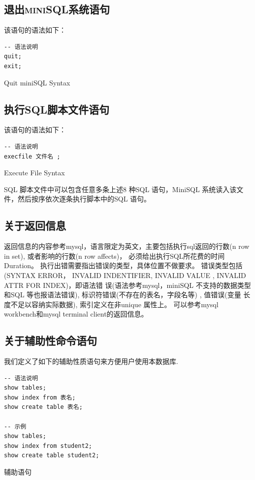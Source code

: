 \documentclass[UTF8]{ctexrep} %
\newenvironment{longlisting}{\captionsetup{type=listing}}{}
\begin{document}
\subsection{退出\textsc{miniSQL}系统语句}
该语句的语法如下：
\begin{longlisting}
    \begin{verbatim}
-- 语法说明
quit;
exit;
    \end{verbatim}
    \caption{Quit miniSQL Syntax}
    \label{lst:quit_miniSQL_requirements}
\end{longlisting}

\subsection{执行SQL脚本文件语句}
该语句的语法如下：
\begin{longlisting}
    \begin{verbatim}
-- 语法说明
execfile 文件名 ;
    \end{verbatim}
    \caption{Execute File Syntax}
    \label{lst:execfile_requirements}
\end{longlisting}
SQL 脚本文件中可以包含任意多条上述8 种SQL 语句，MiniSQL 系统读入该文件，然后按序依次逐条执行脚本中的SQL
语句。

\subsection{关于返回信息}
返回信息的内容参考mysql，语言限定为英文，主要包括执行sql返回的行数(n row in set), 或者影响的行数(n row affects)，
必须给出执行SQL所花费的时间Duration。
执行出错需要指出错误的类型，具体位置不做要求。
错误类型包括(SYNTAX ERROR， INVALID INDENTIFIER, INVALID VALUE , INVALID ATTR FOR INDEX)，即语法错
误(语法参考mysql，miniSQL 不支持的数据类型和SQL 等也报语法错误), 标识符错误(不存在的表名，字段名等) , 值错误(变量
长度不足以容纳实际数据), 索引定义在非unique 属性上。
可以参考mysql workbench和mysql terminal client的返回信息。

\subsection{关于辅助性命令语句}
我们定义了如下的辅助性质语句来方便用户使用本数据库.
\begin{longlisting}
    \begin{verbatim}
-- 语法说明
show tables;
show index from 表名;
show create table 表名;

-- 示例
show tables;
show index from student2;
show create table student2;
    \end{verbatim}
    \caption{辅助语句}
    \label{lst:auxiliary_syntax}
\end{longlisting}
\end{document}
